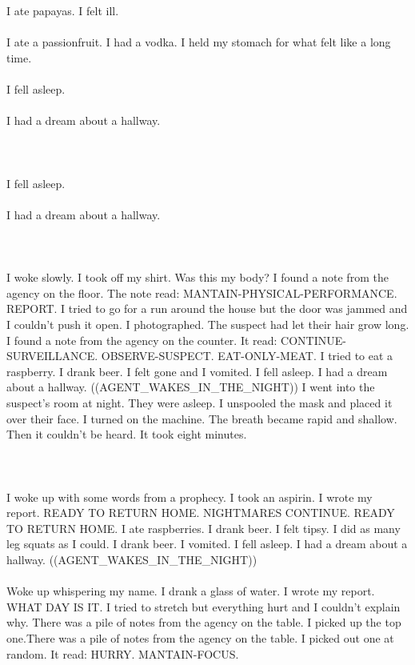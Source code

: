 \documentclass{article}
\begin{document}
    \section{}
    I ate papayas. I felt ill.\\\\I ate a passionfruit. I had a vodka. I held my stomach for what felt like a long time.\\\\I fell asleep.\\\\I had a dream about a hallway.\\\\ 
    \newpage
    
    \section{}
    I fell asleep.\\\\I had a dream about a hallway.\\\\ 
    \newpage
    
    \section{}
    I woke slowly. I took off my shirt. Was this my body? I found a note from the agency on the floor. The note read: MANTAIN-PHYSICAL-PERFORMANCE. REPORT. I tried to go for a run around the house but the door was jammed and I couldn't push it open. I photographed. The suspect had let their hair grow long. I found a note from the agency on the counter. It read: CONTINUE-SURVEILLANCE. OBSERVE-SUSPECT. EAT-ONLY-MEAT. I tried to eat a raspberry. I drank beer. I felt gone and I vomited. I fell asleep. I had a dream about a hallway. ((AGENT_WAKES_IN_THE_NIGHT)) I went into the suspect's room at night. They were asleep. I unspooled the mask and placed it over their face. I turned on the machine. The breath became rapid and shallow. Then it couldn't be heard. It took eight minutes. \\\\
    \newpage
    
    \section{}
    I woke up with some words from a prophecy. I took an aspirin. I wrote my report. READY TO RETURN HOME. NIGHTMARES CONTINUE. READY TO RETURN HOME. I ate raspberries. I drank beer. I felt tipsy. I did as many leg squats as I could. I drank beer. I vomited. I fell asleep. I had a dream about a hallway. ((AGENT_WAKES_IN_THE_NIGHT)) \\\\Woke up whispering my name. I drank a glass of water. I wrote my report. WHAT DAY IS IT. I tried to stretch but everything hurt and I couldn't explain why. There was a pile of notes from the agency on the table. I picked up the top one.There was a pile of notes from the agency on the table. I picked out one at random. It read: HURRY. MANTAIN-FOCUS. \\\\
    \newpage
    
\end{document}
